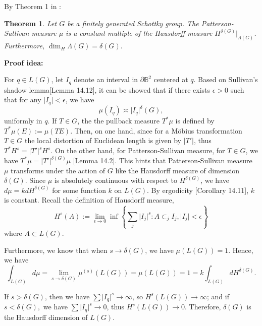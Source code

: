 \documentclass[12pt,oneside]{sfsuthesis}
\theoremstyle{plain} %
\newtheorem{theorem}{Theorem}[chapter]
\theoremstyle{definition}  %
\theoremstyle{remark}  %
\theoremstyle{plain}
\begin{document}
{By Theorem 1 in \cite{sullivan1984entropy}:
\begin{theorem}\label{Theorem14.14inBorthwick}%
Let $G$ be a finitely generated Schottky group. The Patterson-Sullivan measure $\mu$ is a constant multiple of the Hausdorff measure $H^{\delta(G)}\vert_{\Lambda(G)}$. Furthermore, $\dim_H\Lambda(G)=\delta(G).$
\end{theorem}

\noindent\textbf{Proof idea:}

For $q\in L(G)$, let $I_q$ denote an interval in $\partial \mathbb{B}^2$ centered at $q$. Based on Sullivan's shadow lemma\cite{borthwick2007spectral}[Lemma 14.12], it can be showed that if there exists $\epsilon>0$ such that for any $\vert I_q\vert<\epsilon$, we have 
$$
\mu\left(I_q\right)\asymp \vert I_q\vert^\delta(G),
$$
uniformly in $q$. If $T\in G$, the the pullback measure $T^\ast \mu$ is defined by $T^\ast \mu(E):=\mu(TE)$. Then, on one hand, since for a M\"{o}bius transformation $T\in G$ the local distortion of Euclidean length is given by $\vert T'\vert$, thus $T^\ast H^s=\vert T' \vert^s H^s$. On the other hand, for Patterson-Sullivan measure, for $T\in G$, we have $T^\ast \mu=\vert T' \vert^{\delta(G)} \mu$ \cite{borthwick2007spectral}[Lemma 14.2]. This hints that Patterson-Sullivan measure $\mu$ transforms under the action of $G$ like the Hausdorff measure of dimension $\delta(G)$. Since $\mu$ is absolutely continuous with respect to $H^{\delta(G)}$, we have $d\mu=kdH^{\delta(G)}$ for some function $k$ on $L(G)$. By ergodicity \cite{borthwick2007spectral}[Corollary 14.11], $k$ is constant.
Recall the definition of Hausdorff measure,
$$
H^s\left(A\right):=\lim\limits_{\epsilon\to 0}\inf\left\lbrace \sum\limits_{j}\vert I_j\vert^s: A\subset_j I_j,\vert I_j\vert<\epsilon \right\rbrace
$$
where $A\subset L(G).$

Furthermore, we know that when $s\to \delta(G)$, we have $\mu(L(G))=1$. Hence, we have
$$
\int_{L(G)} d\mu =\lim\limits_{s\to\delta(G)}\mu^{(s)}(L(G)) = \mu(L(G))=1 = k \int_{L(G)} dH^{\delta(G)}.
$$


If $s>\delta(G)$, then we have $\sum\vert I_q\vert^s\to \infty$, so $H^s\left(L(G)\right)\to \infty$; and if $s<\delta(G),$ we have $\sum\vert I_q\vert^s\to 0$, thus $H^s\left(L(G)\right)\to 0$. Therefore, $\delta(G)$ is the Hausdorff dimension of $L(G)$.






}
\end{document}
